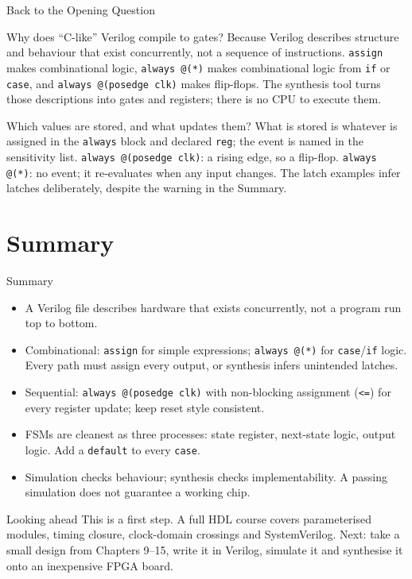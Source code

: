 \documentclass[9pt,aspectratio=169,xcolor=table]{beamer}
\begin{document}
\begin{frame}{Back to the Opening Question}
  \begin{block}{Why does ``C-like'' Verilog compile to gates?}
    \small Because Verilog describes \alert{structure and behaviour that exist concurrently}, not a sequence of instructions. \texttt{assign} makes combinational logic, \texttt{always @(*)} makes combinational logic from \texttt{if} or \texttt{case}, and \texttt{always @(posedge clk)} makes flip-flops. The synthesis tool turns those descriptions into gates and registers; there is no CPU to execute them.
  \end{block}
  \begin{block}{Which values are stored, and what updates them?}
    \small What is stored is whatever is assigned in the \texttt{always} block and declared \texttt{reg}; the event is named in the sensitivity list. \texttt{always @(posedge clk)}: a rising edge, so a flip-flop. \texttt{always @(*)}: no event; it re-evaluates when any input changes. The latch examples infer latches deliberately, despite the warning in the Summary.
  \end{block}
\end{frame}

\section{Summary}

\begin{frame}{Summary}
  \begin{itemize}\itemsep3pt\small
    \item A Verilog file describes \alert{hardware that exists concurrently}, not a program run top to bottom.
    \item Combinational: \texttt{assign} for simple expressions; \texttt{always @(*)} for \texttt{case}/\texttt{if} logic. Every path must assign every output, or synthesis infers unintended latches.
    \item Sequential: \texttt{always @(posedge clk)} with non-blocking assignment (\texttt{<=}) for every register update; keep reset style consistent.
    \item FSMs are cleanest as three processes: state register, next-state logic, output logic. Add a \texttt{default} to every \texttt{case}.
    \item Simulation checks behaviour; synthesis checks implementability. A passing simulation does not guarantee a working chip.
  \end{itemize}
  \begin{block}{Looking ahead}
    This is a first step. A full HDL course covers parameterised modules, timing closure, clock-domain crossings and SystemVerilog. Next: take a small design from Chapters 9--15, write it in Verilog, simulate it and synthesise it onto an inexpensive FPGA board.
  \end{block}
\end{frame}
\end{document}

